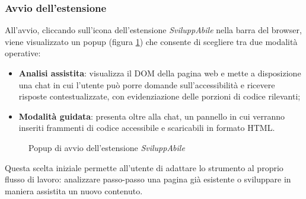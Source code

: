 \subsubsection{Avvio dell'estensione}
\noindent All’avvio, cliccando sull’icona dell’estensione \textit{SviluppAbile} nella barra del browser, viene visualizzato un popup (figura \ref{fig:popup}) che consente di scegliere tra due modalità operative:
\begin{itemize}
  \item \textbf{Analisi assistita}: visualizza il DOM della pagina web e mette a disposizione una chat in cui l’utente può porre domande sull’accessibilità e ricevere risposte contestualizzate, con evidenziazione delle porzioni di codice rilevanti; 
  \item \textbf{Modalità guidata}: presenta oltre alla chat, un pannello in cui verranno inseriti frammenti di codice accessibile e scaricabili in formato HTML.
\end{itemize}

\begin{figure}[H]
    \centering
    \caption{Popup di avvio dell'estensione \textit{SviluppAbile}}\label{fig:popup}
\end{figure}

\noindent Questa scelta iniziale permette all’utente di adattare lo strumento al proprio flusso di lavoro: analizzare passo-passo una pagina già esistente o sviluppare in maniera assistita un nuovo contenuto.

